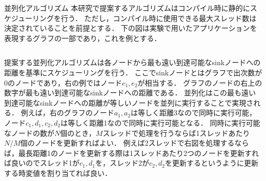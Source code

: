 \documentclass[dvipdfmx,final,t,10pt]{beamer}
\begin{document}
\begin{frame}[fragile]

    \begin{block}{並列化アルゴリズム}
        \vskip 0.25cm
        本研究で提案するアルゴリズムはコンパイル時に静的にスケジューリングを行う．
        ただし，コンパイル時に使用できる最大スレッド数は決定されていることを前提とする．
        下の図は実験で用いたアプリケーションを表現するグラフの一部であり，これを例とする．
        \begin{columns}
            \begin{column}{0.665\textwidth}
                提案する並列化アルゴリズムは各ノードから最も遠い到達可能なsinkノードへの距離を基準にスケジューリングを行う．
                ここでsinkノードとはグラフで出次数が0のノードであり，右の例ではノード$e_1,e_2$が相当する．
                グラフのノードの右上の数字が最も遠い到達可能なsinkノードへの距離である．
                並列化はこの最も遠い到達可能なsinkノードへの距離が等しいノードを並列に実行することで実現される．
                例えば，右のグラフのノード$a_1,a_2$は等しく距離3なので同時に実行可能，ノード$c_1,d_1,c_2,d_2$は等しく距離1なので同時に実行可能となる．
                同時に実行可能なノードの数が$N$個のとき，$M$スレッドで処理を行うならば1スレッドあたり$N/M$個のノードを更新すればよい．
                例えば2スレッドで右図を処理するならば，最長距離1のノードを更新する際は1スレッドあたり2つのノードを更新すれば良いのでスレッド1が$c_1,d_1$を，スレッド2が$c_2,d_2$を更新するというように更新する時変値を割り当てれば良い．

\end{column}
\end{columns}
\end{block}
\end{frame}
\end{document}
